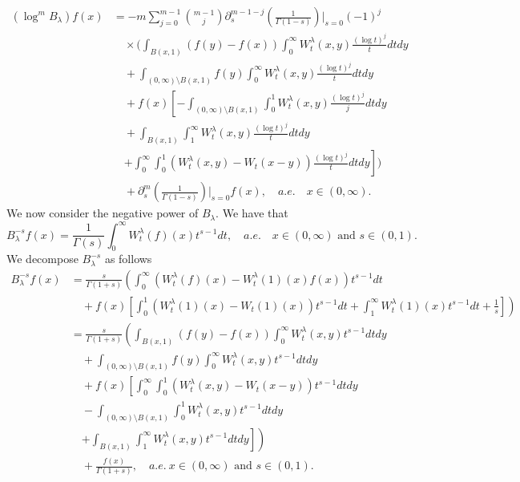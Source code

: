 \documentclass[a4paper,10pt, reqno]{amsart}
\theoremstyle{definition}
\theoremstyle{remark}
\numberwithin{equation}{section}
\begin{document}
\begin{align}\label{eq: representation log m Bessel s=0}
    (\log^m B_\lambda)f(x)&=-m\sum_{j=0}^{m-1}\binom{m-1}{j}\partial_s^{m-1-j}\left(\frac{1}{\Gamma (1-s)}\right)\Bigg|_{s=0}(-1)^j\nonumber\\
    &\quad \times \Bigg(\int_{B(x,1)}(f(y)-f(x))\int_0^\infty W_t^\lambda (x,y)\frac{(\log t)^j}{t}dtdy\nonumber\\
    &\quad +\int_{(0,\infty)\setminus B(x,1)}f(y)\int_0^\infty W_t^\lambda (x,y)\frac{(\log t)^j}{t}dtdy\nonumber\\
    &\quad +f(x)\left[-\int_{(0,\infty)\setminus B(x,1)}\int_0^1W_t^\lambda (x,y)\frac{(\log t)^j}{j}dtdy\right.\nonumber\\
    &\quad +\int_{B(x,1)}\int_1^\infty W_t^\lambda (x,y)\frac{(\log t)^j}{t}dtdy\nonumber\\
    &\quad \left.+\int_0^\infty\int_0^1(W_t^\lambda (x,y)-W_t(x-y))\frac{(\log t)^j}{t}dtdy\right]\Bigg)\nonumber\\
    &\quad +\partial_s^{m}\left(\frac{1}{\Gamma (1-s)}\right)\Bigg|_{s=0}f(x),\quad a.e. \quad  x\in (0,\infty).
    \end{align}
We now consider the negative power of $B_\lambda$. We have that
\[
B_\lambda^{-s}f(x)=\frac{1}{\Gamma (s)}\int_0^\infty W_t^\lambda (f)(x)t^{s-1}dt,\quad a.e.\quad  x\in (0,\infty)\mbox{ and }s\in (0,1).
\]
We decompose $B_\lambda^{-s}$ as follows
\begin{align}\label{eq: decomposition Bessel negative power}
   B_\lambda^{-s}f(x)&=\frac{s}{\Gamma (1+s)}\left(\int_0^\infty (W_t^\lambda (f)(x)-W_t^\lambda (1)(x)f(x))t^{s-1}dt\right.\nonumber\\
    &\quad +\left.f(x)\left[\int_0^1(W_t^\lambda (1)(x)-W_t(1)(x))t^{s-1}dt +\int_1^\infty  W_t^\lambda (1)(x)t^{s-1}dt+\frac{1}{s}\right]\right)\nonumber\\
    &=\frac{s}{\Gamma (1+s)}\left(\int_{B(x,1)} (f(y)-f(x))\int_0^\infty W_t^\lambda (x,y)t^{s-1}dtdy\right.\nonumber\\
    &\quad +\int_{(0,\infty)\setminus B(x,1)}f(y)\int_0^\infty W_t^\lambda (x,y)t^{s-1}dtdy\nonumber\\
    &\quad +f(x)\left[\int_0^\infty \int_0^1(W_t^\lambda(x,y)-W_t(x-y))t^{s-1}dtdy\right.\nonumber\\
    &\quad -\int_{(0,\infty)\setminus B(x,1)}\int_0^1 W_t^\lambda (x,y)t^{s-1}dtdy\nonumber\\
    &\quad \left.\left.+\int_{B(x,1)}\int _1^\infty W_t^\lambda (x,y)t^{s-1}dtdy\right]\right)\nonumber\\
    &\quad +\frac{f(x)}{\Gamma (1+s)},\quad a.e.\ x\in (0,\infty)\mbox{ and }s\in (0,1).
\end{align}
\end{document}
